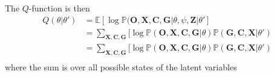 \documentclass[10pt,a4paper]{article}
\newcommand{\MO}{\mathbf{O}}
\newcommand{\MX}{\mathbf{X}}
\newcommand{\MC}{\mathbf{C}}
\newcommand{\MG}{\mathbf{G}}
\newcommand{\MZ}{\mathbf{Z}}
\newcommand{\BE}{\mathbb{E}}
\newcommand{\BP}{\mathbb{P}}
\begin{document}
	The $Q$-function is then
	\begin{align}
Q(\theta | \theta') &= \BE[\log \BP(\MO, \MX, \MC, \MG | \theta, \psi, \MZ | \theta'] \\
&= \sum_{\MX, \MC, \MG}[\log \BP(\MO, \MX, \MC, \MG | \theta) \BP(\MG,\MC,\MX | \theta')\\
&= \sum_{\MX, \MC, \MG}[\log \BP(\MO, \MX, \MC, \MG | \theta) \BP(\MG,\MC,\MX | \theta')\\
	\end{align}
	where the sum is over all possible states of the latent variables
\end{document}
